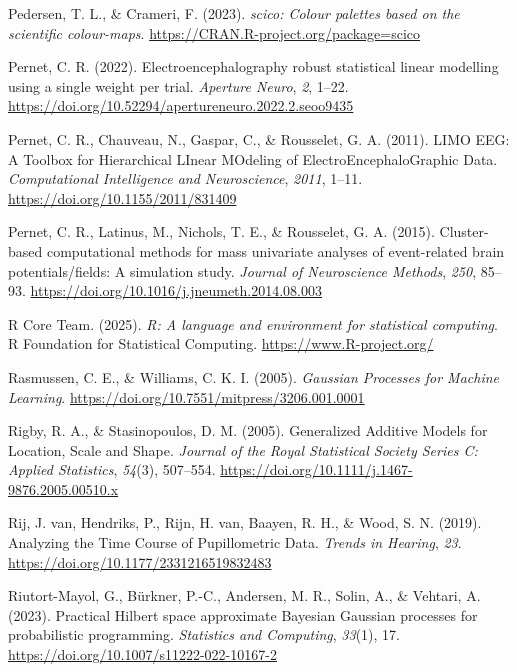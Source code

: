 \documentclass[
  doc,
  floatsintext,
  longtable,
  a4paper,
  nolmodern,
  notxfonts,
  notimes,
  colorlinks=true,linkcolor=blue,citecolor=blue,urlcolor=blue]{apa7}
\newlength{\cslhangindent}
\newenvironment{CSLReferences}[2] %
 {\begin{list}{}{%
  \setlength{\itemindent}{0pt}
  \setlength{\leftmargin}{0pt}
  \setlength{\parsep}{0pt}
  \ifodd #1
   \setlength{\leftmargin}{\cslhangindent}
   \setlength{\itemindent}{-1\cslhangindent}
  \fi
  \setlength{\itemsep}{#2\baselineskip}}}
 {\end{list}}
\begin{document}
\begin{CSLReferences}{1}{0}
Pedersen, T. L., \& Crameri, F. (2023). \emph{{scico}: Colour palettes
based on the scientific colour-maps}.
\url{https://CRAN.R-project.org/package=scico}

Pernet, C. R. (2022). Electroencephalography robust statistical linear
modelling using a single weight per trial. \emph{Aperture Neuro},
\emph{2}, 1--22.
\url{https://doi.org/10.52294/apertureneuro.2022.2.seoo9435}

Pernet, C. R., Chauveau, N., Gaspar, C., \& Rousselet, G. A. (2011).
LIMO EEG: A Toolbox for Hierarchical LInear MOdeling of
ElectroEncephaloGraphic Data. \emph{Computational Intelligence and
Neuroscience}, \emph{2011}, 1--11.
\url{https://doi.org/10.1155/2011/831409}

Pernet, C. R., Latinus, M., Nichols, T. E., \& Rousselet, G. A. (2015).
Cluster-based computational methods for mass univariate analyses of
event-related brain potentials/fields: A simulation study. \emph{Journal
of Neuroscience Methods}, \emph{250}, 85--93.
\url{https://doi.org/10.1016/j.jneumeth.2014.08.003}

R Core Team. (2025). \emph{{R}: A language and environment for
statistical computing}. R Foundation for Statistical Computing.
\url{https://www.R-project.org/}

Rasmussen, C. E., \& Williams, C. K. I. (2005). \emph{Gaussian Processes
for Machine Learning}.
\url{https://doi.org/10.7551/mitpress/3206.001.0001}

Rigby, R. A., \& Stasinopoulos, D. M. (2005). Generalized Additive
Models for Location, Scale and Shape. \emph{Journal of the Royal
Statistical Society Series C: Applied Statistics}, \emph{54}(3),
507--554. \url{https://doi.org/10.1111/j.1467-9876.2005.00510.x}

Rij, J. van, Hendriks, P., Rijn, H. van, Baayen, R. H., \& Wood, S. N.
(2019). Analyzing the Time Course of Pupillometric Data. \emph{Trends in
Hearing}, \emph{23}. \url{https://doi.org/10.1177/2331216519832483}

Riutort-Mayol, G., Bürkner, P.-C., Andersen, M. R., Solin, A., \&
Vehtari, A. (2023). Practical {Hilbert} space approximate {Bayesian
Gaussian} processes for probabilistic programming. \emph{Statistics and
Computing}, \emph{33}(1), 17.
\url{https://doi.org/10.1007/s11222-022-10167-2}


\end{CSLReferences}
\end{document}
